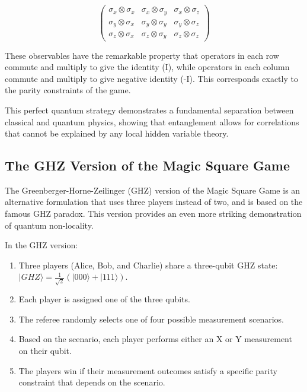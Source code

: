 \documentclass[12pt,a4paper]{article}
\begin{document}
\begin{equation}
\begin{pmatrix}
\sigma_x \otimes \sigma_x & \sigma_x \otimes \sigma_y & \sigma_x \otimes \sigma_z \\
\sigma_y \otimes \sigma_x & \sigma_y \otimes \sigma_y & \sigma_y \otimes \sigma_z \\
\sigma_z \otimes \sigma_x & \sigma_z \otimes \sigma_y & \sigma_z \otimes \sigma_z
\end{pmatrix}
\end{equation}

These observables have the remarkable property that operators in each row commute and multiply to give the identity (I), while operators in each column commute and multiply to give negative identity (-I). This corresponds exactly to the parity constraints of the game.

This perfect quantum strategy demonstrates a fundamental separation between classical and quantum physics, showing that entanglement allows for correlations that cannot be explained by any local hidden variable theory.

\subsection{The GHZ Version of the Magic Square Game}

The Greenberger-Horne-Zeilinger (GHZ) version of the Magic Square Game is an alternative formulation that uses three players instead of two, and is based on the famous GHZ paradox. This version provides an even more striking demonstration of quantum non-locality.

In the GHZ version:

\begin{enumerate}
    \item Three players (Alice, Bob, and Charlie) share a three-qubit GHZ state: $|GHZ\rangle = \frac{1}{\sqrt{2}}(|000\rangle + |111\rangle)$.
    \item Each player is assigned one of the three qubits.
    \item The referee randomly selects one of four possible measurement scenarios.
    \item Based on the scenario, each player performs either an X or Y measurement on their qubit.
    \item The players win if their measurement outcomes satisfy a specific parity constraint that depends on the scenario.
\end{enumerate}
\end{document}
